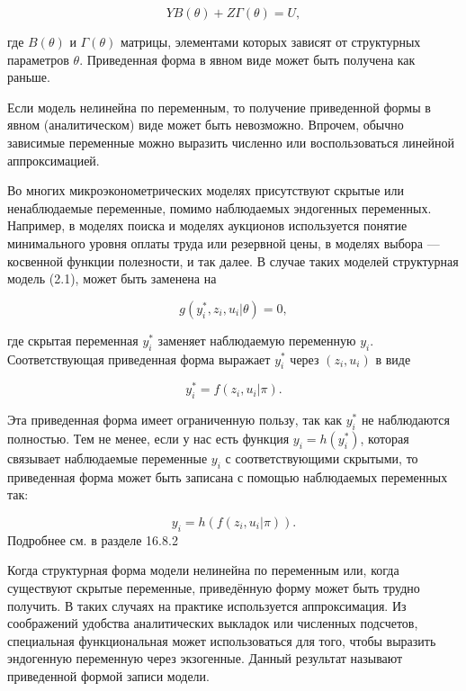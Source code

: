 \begin{equation}
YB(\theta)+Z\Gamma(\theta)=U,
\end{equation}

где $B(\theta)$ и $\Gamma(\theta)$ матрицы, элементами которых зависят от структурных параметров $\theta$. Приведенная форма в явном виде может быть получена как раньше. 

Если модель нелинейна по переменным, то получение приведенной формы в явном (аналитическом) виде может быть невозможно. Впрочем, обычно зависимые переменные можно выразить численно или воспользоваться линейной аппроксимацией.


Во многих микроэконометрических моделях присутствуют скрытые или ненаблюдаемые переменные, помимо наблюдаемых эндогенных переменных. Например, в моделях поиска и моделях аукционов используется понятие минимального уровня оплаты труда или резервной цены, в моделях выбора --- косвенной функции полезности, и так далее. В случае таких моделей структурная модель (2.1), может быть заменена на

\begin{equation}
g(y^{\ast}_{i},z_{i},u_{i}|\theta)=0,
\end{equation}

где скрытая переменная $y^{\ast}_{i}$ заменяет наблюдаемую переменную $y_{i}$. Соответствующая приведенная форма выражает $y^{\ast}_{i}$ через $(z_{i},u_{i})$ в виде

\begin{equation}
y^{\ast}_{i}=f(z_{i},u_{i}|\pi).
\end{equation}


Эта приведенная форма имеет ограниченную пользу, так как $y^{\ast}_{i}$ не наблюдаются полностью. Тем не менее, если у нас есть функция $y_{i}=h(y^{\ast}_{i})$, которая связывает  наблюдаемые  переменные $y_{i}$ с соответствующими скрытыми, то приведенная форма может быть записана с помощью  наблюдаемых переменных  так:

\begin{equation}
y_{i}=h(f(z_{i},u_{i}|\pi)).
\end{equation}
Подробнее см. в разделе 16.8.2


Когда структурная форма модели  нелинейна по  переменным или, когда существуют скрытые переменные, приведённую форму может быть  трудно получить. В таких случаях на практике используется аппроксимация. Из соображений удобства аналитических выкладок или численных подсчетов, специальная функциональная может использоваться для того, чтобы выразить эндогенную переменную через  экзогенные. Данный результат называют приведенной формой записи модели.  



